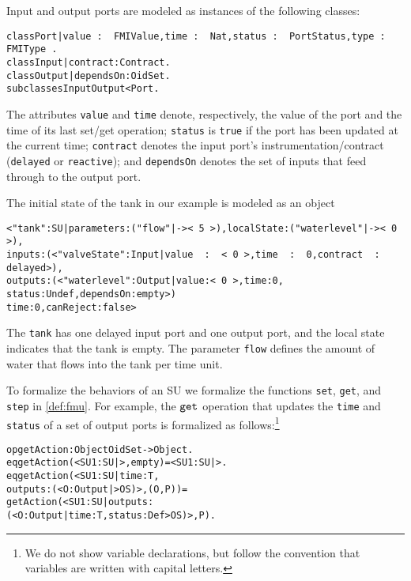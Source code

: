 Input and output ports are modeled as  instances of the following
classes:

\small
\begin{alltt}
class Port | value\,:\,\,FMIValue, time\,:\,\,Nat, status\,:\,\,PortStatus, type\,:\,\,FMIType\,. 
class Input | contract : Contract .
class Output | dependsOn : OidSet .     
subclasses Input Output < Port .
\end{alltt}
\normalsize

\noindent The attributes \texttt{value} and \texttt{time} denote, respectively, the
value of the port and the time of its last set/get operation; 
\texttt{status} is \texttt{true}  if the port has been
updated  at the current time;   \texttt{contract} denotes the
input port's instrumentation/contract (\texttt{delayed} or
\texttt{reactive}); and 
\texttt{dependsOn} denotes the set of inputs that feed
through to the output port. 

\begin{example}
The initial state of the tank in our  example is modeled as an object
  
\scriptsize
\begin{alltt}
< "tank" : SU | parameters : ("flow" |-> <\,5\,>),  localState : ("waterlevel" |-> <\,0\,>),
                inputs : (< "valveState" : Input | value\,\,:\,\,<\,0\,>, time\,\,:\,\,0, contract\,\,:\,\,delayed >),
                outputs : (< "waterlevel" : Output | value : <\,0\,>, time : 0,
                                                     status : Undef, dependsOn : empty >)
                time : 0,  canReject : false >
\end{alltt}
\normalsize

\noindent The \texttt{tank} has one delayed input port and one output
port, and the local state indicates that the tank is empty.  
The parameter \texttt{flow} defines the amount of water that flows
into the tank per time unit.
\end{example}

To formalize the behaviors of an SU we formalize the functions
\texttt{set}, \texttt{get}, and \texttt{step} in
\cref{def:fmu}. 
For example, the $\mathtt{get}_{}$ operation that updates the \texttt{time}
and \texttt{status}  of a set
of output ports is formalized as follows:\footnote{We do not show
  variable declarations, but follow the convention that variables are
  written with capital letters.} 

\small
\begin{alltt}
  op getAction : Object OidSet -> Object .
  eq getAction(< SU1 : SU | >, empty) = < SU1 : SU | > .
  eq getAction(< SU1 : SU | time : T, 
                            outputs : (< O : Output | > OS) >, (O , P)) = 
     getAction(< SU1 : SU | outputs : 
                     (< O : Output | time : T, status : Def > OS) >, P) .
\end{alltt}
\normalsize

